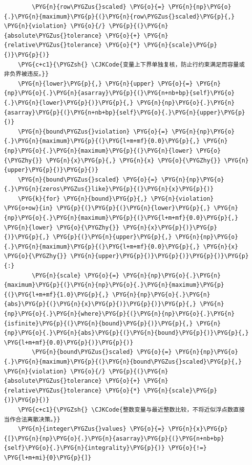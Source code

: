 \begin{Verbatim}
        \PYG{n}{row\PYGZus{}scaled} \PYG{o}{=} \PYG{n}{np}\PYG{o}{.}\PYG{n}{maximum}\PYG{p}{(}\PYG{n}{row\PYGZus{}scaled}\PYG{p}{,} \PYG{n}{violation} \PYG{o}{/} \PYG{p}{(}\PYG{n}{absolute\PYGZus{}tolerance} \PYG{o}{+} \PYG{n}{relative\PYGZus{}tolerance} \PYG{o}{*} \PYG{n}{scale}\PYG{p}{)}\PYG{p}{)}
    \PYG{c+c1}{\PYGZsh{} \CJKCode{变量上下界单独复核，防止行约束满足而容量或非负界被违反。}}
    \PYG{n}{lower}\PYG{p}{,} \PYG{n}{upper} \PYG{o}{=} \PYG{n}{np}\PYG{o}{.}\PYG{n}{asarray}\PYG{p}{(}\PYG{n+nb+bp}{self}\PYG{o}{.}\PYG{n}{lower}\PYG{p}{)}\PYG{p}{,} \PYG{n}{np}\PYG{o}{.}\PYG{n}{asarray}\PYG{p}{(}\PYG{n+nb+bp}{self}\PYG{o}{.}\PYG{n}{upper}\PYG{p}{)}
    \PYG{n}{bound\PYGZus{}violation} \PYG{o}{=} \PYG{n}{np}\PYG{o}{.}\PYG{n}{maximum}\PYG{p}{(}\PYG{l+m+mf}{0.0}\PYG{p}{,} \PYG{n}{np}\PYG{o}{.}\PYG{n}{maximum}\PYG{p}{(}\PYG{n}{lower} \PYG{o}{\PYGZhy{}} \PYG{n}{x}\PYG{p}{,} \PYG{n}{x} \PYG{o}{\PYGZhy{}} \PYG{n}{upper}\PYG{p}{)}\PYG{p}{)}
    \PYG{n}{bound\PYGZus{}scaled} \PYG{o}{=} \PYG{n}{np}\PYG{o}{.}\PYG{n}{zeros\PYGZus{}like}\PYG{p}{(}\PYG{n}{x}\PYG{p}{)}
    \PYG{k}{for} \PYG{n}{bound}\PYG{p}{,} \PYG{n}{violation} \PYG{o+ow}{in} \PYG{p}{(}\PYG{p}{(}\PYG{n}{lower}\PYG{p}{,} \PYG{n}{np}\PYG{o}{.}\PYG{n}{maximum}\PYG{p}{(}\PYG{l+m+mf}{0.0}\PYG{p}{,} \PYG{n}{lower} \PYG{o}{\PYGZhy{}} \PYG{n}{x}\PYG{p}{)}\PYG{p}{)}\PYG{p}{,} \PYG{p}{(}\PYG{n}{upper}\PYG{p}{,} \PYG{n}{np}\PYG{o}{.}\PYG{n}{maximum}\PYG{p}{(}\PYG{l+m+mf}{0.0}\PYG{p}{,} \PYG{n}{x} \PYG{o}{\PYGZhy{}} \PYG{n}{upper}\PYG{p}{)}\PYG{p}{)}\PYG{p}{)}\PYG{p}{:}
        \PYG{n}{scale} \PYG{o}{=} \PYG{n}{np}\PYG{o}{.}\PYG{n}{maximum}\PYG{p}{(}\PYG{n}{np}\PYG{o}{.}\PYG{n}{maximum}\PYG{p}{(}\PYG{l+m+mf}{1.0}\PYG{p}{,} \PYG{n}{np}\PYG{o}{.}\PYG{n}{abs}\PYG{p}{(}\PYG{n}{x}\PYG{p}{)}\PYG{p}{)}\PYG{p}{,} \PYG{n}{np}\PYG{o}{.}\PYG{n}{where}\PYG{p}{(}\PYG{n}{np}\PYG{o}{.}\PYG{n}{isfinite}\PYG{p}{(}\PYG{n}{bound}\PYG{p}{)}\PYG{p}{,} \PYG{n}{np}\PYG{o}{.}\PYG{n}{abs}\PYG{p}{(}\PYG{n}{bound}\PYG{p}{)}\PYG{p}{,} \PYG{l+m+mf}{0.0}\PYG{p}{)}\PYG{p}{)}
        \PYG{n}{bound\PYGZus{}scaled} \PYG{o}{=} \PYG{n}{np}\PYG{o}{.}\PYG{n}{maximum}\PYG{p}{(}\PYG{n}{bound\PYGZus{}scaled}\PYG{p}{,} \PYG{n}{violation} \PYG{o}{/} \PYG{p}{(}\PYG{n}{absolute\PYGZus{}tolerance} \PYG{o}{+} \PYG{n}{relative\PYGZus{}tolerance} \PYG{o}{*} \PYG{n}{scale}\PYG{p}{)}\PYG{p}{)}
    \PYG{c+c1}{\PYGZsh{} \CJKCode{整数变量与最近整数比较，不将近似浮点数直接当作合法离散决策。}}
    \PYG{n}{integer\PYGZus{}values} \PYG{o}{=} \PYG{n}{x}\PYG{p}{[}\PYG{n}{np}\PYG{o}{.}\PYG{n}{asarray}\PYG{p}{(}\PYG{n+nb+bp}{self}\PYG{o}{.}\PYG{n}{integrality}\PYG{p}{)} \PYG{o}{!=} \PYG{l+m+mi}{0}\PYG{p}{]}

\end{Verbatim}
